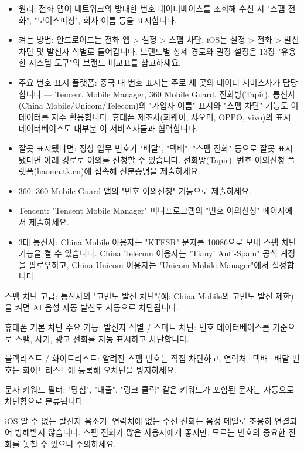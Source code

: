 
\begin{itemize}
  \item 원리: 전화 앱이 네트워크의 방대한 번호 데이터베이스를 조회해 수신 시 "스팸 전화", "보이스피싱", 회사 이름 등을 표시합니다.
  \item 켜는 방법: 안드로이드는 전화 앱 > 설정 > 스팸 차단, iOS는 설정 > 전화 > 발신 차단 및 발신자 식별로 들어갑니다. 브랜드별 상세 경로와 권장 설정은 13장 "유용한 시스템 도구"의 브랜드 비교표를 참고하세요.
  \item 주요 번호 표시 플랫폼: 중국 내 번호 표시는 주로 세 곳의 데이터 서비스사가 담당합니다 — Tencent Mobile Manager, 360 Mobile Guard, 전화방(Tapir). 통신사(China Mobile/Unicom/Telecom)의 "가입자 이름" 표시와 "스팸 차단" 기능도 이 데이터를 자주 활용합니다. 휴대폰 제조사(화웨이, 샤오미, OPPO, vivo)의 표시 데이터베이스도 대부분 이 서비스사들과 협력합니다.
  \item 잘못 표시됐다면: 정상 업무 번호가 "배달", "택배", "스팸 전화" 등으로 잘못 표시됐다면 아래 경로로 이의를 신청할 수 있습니다. 전화방(Tapir): 번호 이의신청 플랫폼(haoma.tk.cn)에 접속해 신분증명을 제출하세요.
  \item 360: 360 Mobile Guard 앱의 "번호 이의신청" 기능으로 제출하세요.
  \item Tencent: "Tencent Mobile Manager" 미니프로그램의 "번호 이의신청" 페이지에서 제출하세요.
  \item 3대 통신사: China Mobile 이용자는 "KTFSR" 문자를 10086으로 보내 스팸 차단 기능을 켤 수 있습니다. China Telecom 이용자는 "Tianyi Anti-Spam" 공식 계정을 팔로우하고, China Unicom 이용자는 "Unicom Mobile Manager"에서 설정합니다.
\end{itemize}

스팸 차단 고급: 통신사의 "고빈도 발신 차단"(예: China Mobile의 고빈도 발신 제한)을 켜면 AI 음성 자동 발신도 자동으로 차단됩니다.

휴대폰 기본 차단 주요 기능: 발신자 식별 / 스마트 차단: 번호 데이터베이스를 기준으로 스팸, 사기, 광고 전화를 자동 표시하고 차단합니다.

블랙리스트 / 화이트리스트: 알려진 스팸 번호는 직접 차단하고, 연락처·택배·배달 번호는 화이트리스트에 등록해 오차단을 방지하세요.

문자 키워드 필터: "당첨", "대출", "링크 클릭" 같은 키워드가 포함된 문자는 자동으로 차단함으로 분류됩니다.

iOS 알 수 없는 발신자 음소거: 연락처에 없는 수신 전화는 음성 메일로 조용히 연결되어 방해받지 않습니다. 스팸 전화가 많은 사용자에게 좋지만, 모르는 번호의 중요한 전화를 놓칠 수 있으니 주의하세요.

